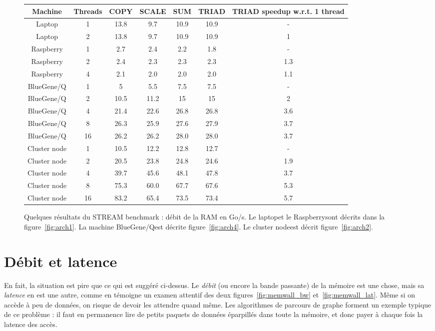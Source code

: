 \begin{figure}
  \centering
\begin{tabular}{|cc|cccc|c|}
  \hline
  Machine   & Threads & COPY & SCALE & SUM & TRIAD & TRIAD speedup w.r.t. 1 thread\\
    \hline  \hline
  Laptop    & 1 & 13.8 & 9.7 & 10.9 & 10.9 & -\\
  Laptop    & 2 & 13.8 & 9.7 & 10.9 & 10.9 & 1 \\
  \hline
  Raspberry    & 1 & 2.7 & 2.4 &  2.2 &  1.8 & - \\
  Raspberry    & 2 & 2.4 & 2.3 &  2.3 &  2.3   & 1.3 \\
  Raspberry    & 4 & 2.1 & 2.0 &  2.0 &  2.0   & 1.1 \\
  \hline
  BlueGene/Q      & 1  & 5   & 5.5   & 7.5   & 7.5  & -\\ 
  BlueGene/Q      & 2  & 10.5 & 11.2 & 15    & 15   & 2\\
  BlueGene/Q      & 4  & 21.4 & 22.6 & 26.8  & 26.8 & 3.6 \\
  BlueGene/Q      & 8  & 26.3 & 25.9 & 27.6  & 27.9 & 3.7 \\
  BlueGene/Q      & 16 & 26.2 & 26.2 & 28.0  & 28.0 & 3.7 \\ 
  \hline
  Cluster node   & 1  & 10.5 & 12.2 & 12.8 & 12.7 & - \\
  Cluster node   & 2  & 20.5 & 23.8 & 24.8 & 24.6 & 1.9 \\
  Cluster node   & 4  & 39.7 & 45.6 & 48.1 & 47.8 & 3.7 \\
  Cluster node   & 8  & 75.3 & 60.0 & 67.7 & 67.6 & 5.3 \\
  Cluster node   & 16 & 83.2 & 65.4 & 73.5 & 73.4   & 5.7 \\
  \hline
\end{tabular}

\caption{Quelques résultats du STREAM benchmark : débit de la RAM en Go/s.  Le
  \og laptop\fg et le \og Raspberry\fg sont décrits dans la
  figure~\ref{fig:arch1}. La machine \og BlueGene/Q\fg est décrite
  figure~\ref{fig:arch4}. Le \og cluster node\fg est décrit
  figure~\ref{fig:arch2}.\label{fig:STREAM_results}}
\end{figure}

\section{Débit et latence}

En fait, la situation est pire que ce qui est suggéré ci-dessus. Le \emph{débit}
(ou encore la \og bande passante\fg) de la mémoire est une chose, mais sa
\emph{latence} en est une autre, comme en témoigne un examen attentif des deux
figures~\ref{fig:memwall_bw} et~\ref{fig:memwall_lat}. Même si on accède à peu
de données, on risque de devoir les attendre quand même. Les algorithmes de
parcours de graphe forment un exemple typique de ce problème : il faut en
permanence lire de petits paquets de données éparpillés dans toute la mémoire,
et donc payer à chaque fois la latence des accès.

